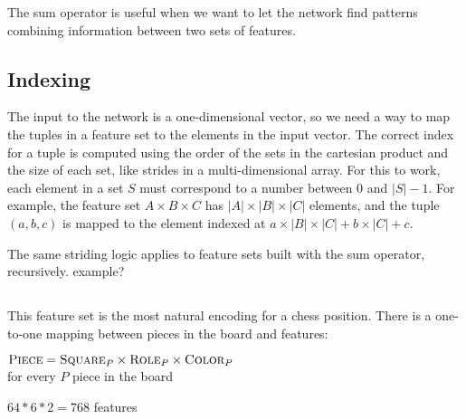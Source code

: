 The sum operator is useful when we want to let the network find patterns combining information between two sets of features.



\subsection{Indexing}

The input to the network is a one-dimensional vector, so we need a way to map the tuples in a feature set to the elements in the input vector. The correct index for a tuple is computed using the order of the sets in the cartesian product and the size of each set, like strides in a multi-dimensional array. For this to work, each element in a set $S$ must correspond to a number between $0$ and $|S| - 1$. For example, the feature set $A \times B \times C$ has $|A| \times |B| \times |C|$ elements, and the tuple $(a, b, c)$ is mapped to the element indexed at $a \times |B| \times |C| + b \times |C| + c$.

The same striding logic applies to feature sets built with the sum operator, recursively. example?

\subsection{\mdseries{}}

This feature set is the most natural encoding for a chess position. There is a one-to-one mapping between pieces in the board and features:

\begin{center}
    $\textsc{Piece} = \textsc{Square}_{P} \times \textsc{Role}_{P} \times \textsc{Color}_{P}$ \\
    for every $P$ piece in the board
\end{center}




$64*6*2=768$ features


\subsection{\mdseries{}}

